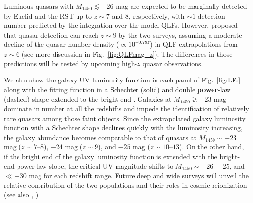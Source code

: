 \documentclass[twocolumn, twocolappendix]{aastex63}
\newcommand{\Muv}{M_{1450}}
\begin{document}
\begin{CJK*}{UTF8}{gbsn}
Luminous quasars with $\Muv \lesssim -26$ mag are expected to be marginally detected by Euclid and the RST up to $z\sim 7$ and 8, respectively,
with $\sim 1$ detection number predicted by the integration over the model QLFs.
However, \citet{2019BAAS...51c.121F} proposed that quasar detection can reach $z\sim 9$ by the two surveys,
assuming a moderate decline of the quasar number density ($\propto 10^{-0.78z}$) in QLF extrapolations from $z\sim 6$
(see more discussion in Fig.~\ref{fig:QLFmag_z}).
The differences in those predictions will be tested by upcoming high-$z$ quasar observations.



We also show the galaxy UV luminosity function in each panel of Fig.~\ref{fig:LFs}
along with the fitting function in a Schechter (solid) and double \textbf{power}-law (dashed) shape extended to the bright end
\citep{2013MNRAS.432.2696M, 2016ApJ...819..129O, 2018ApJ...867..150M, 2019ApJ...883...99S, 2020MNRAS.493.2059B,
2021AJ....162...47B, 2023MNRAS.518.6011D,
2022ApJS..259...20H, Harikane_2022b, Harikane_2022c, 2022ApJ...940L..14N}.
Galaxies at $\Muv\gtrsim -23$ mag dominate in number at all the redshifts and impede
the identification of relatively rare quasars among those faint objects.
Since the extrapolated galaxy luminosity function with a Schechter shape declines quickly with the luminosity increasing,
the galaxy abundance becomes comparable to that of quasars at $\Muv \sim -23$ mag ($z\sim 7$--$8$), $-24$ mag ($z\sim 9$), and $-25$ mag ($z\sim 10$--$13$).
On the other hand, if the bright end of the galaxy luminosity function is extended with the bright-end power-law slope,
the critical UV magnitude shifts to $\Muv\sim-26$, $-25$, and $\ll -30$ mag for each redshift range.
Future deep and wide surveys will unveil the relative contribution of the two populations and their roles in cosmic reionization
(see also , \citealt{2022NatAs...6..850J}).




\end{CJK*}
\end{document}
